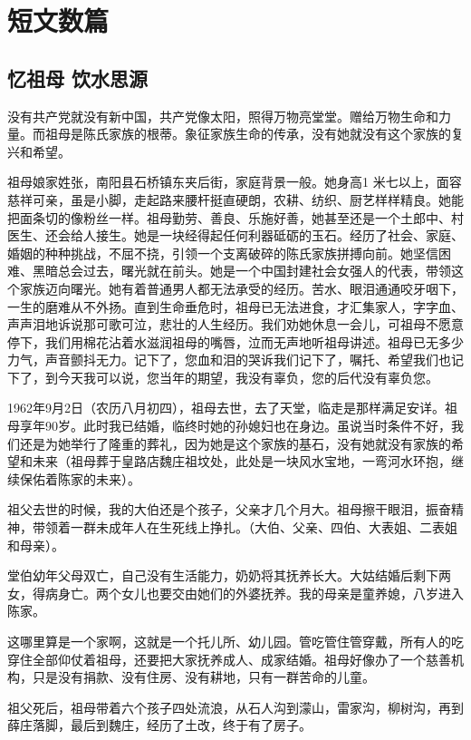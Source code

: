 \chapter{短文数篇}

\section*{忆祖母 饮水思源}

没有共产党就没有新中国，共产党像太阳，照得万物亮堂堂。赠给万物生命和力量。而祖母是陈氏家族的根蒂。象征家族生命的传承，没有她就没有这个家族的复兴和希望。

祖母娘家姓张，南阳县石桥镇东夹后街，家庭背景一般。她身高1 米七以上，面容慈祥可亲，虽是小脚，走起路来腰杆挺直硬朗，农耕、纺织、厨艺样样精良。她能把面条切的像粉丝一样。祖母勤劳、善良、乐施好善，她甚至还是一个土郎中、村医生、还会给人接生。她是一块经得起任何利器砥砺的玉石。经历了社会、家庭、婚姻的种种挑战，不屈不挠，引领一个支离破碎的陈氏家族拼搏向前。她坚信困难、黑暗总会过去，曙光就在前头。她是一个中国封建社会女强人的代表，带领这个家族迈向曙光。她有着普通男人都无法承受的经历。苦水、眼泪通通咬牙咽下，一生的磨难从不外扬。直到生命垂危时，祖母已无法进食，才汇集家人，字字血、声声泪地诉说那可歌可泣，悲壮的人生经历。我们劝她休息一会儿，可祖母不愿意停下，我们用棉花沾着水滋润祖母的嘴唇，泣而无声地听祖母讲述。祖母已无多少力气，声音颤抖无力。记下了，您血和泪的哭诉我们记下了，嘱托、希望我们也记下了，到今天我可以说，您当年的期望，我没有辜负，您的后代没有辜负您。

1962年9月2日（农历八月初四），祖母去世，去了天堂，临走是那样满足安详。祖母享年90岁。此时我已结婚，临终时她的孙媳妇也在身边。虽说当时条件不好，我们还是为她举行了隆重的葬礼，因为她是这个家族的基石，没有她就没有家族的希望和未来（祖母葬于皇路店魏庄祖坟处，此处是一块风水宝地，一弯河水环抱，继续保佑着陈家的未来）。

祖父去世的时候，我的大伯还是个孩子，父亲才几个月大。祖母擦干眼泪，振奋精神，带领着一群未成年人在生死线上挣扎。（大伯、父亲、四伯、大表姐、二表姐和母亲）。

堂伯幼年父母双亡，自己没有生活能力，奶奶将其抚养长大。大姑结婚后剩下两女，得病身亡。两个女儿也要交由她们的外婆抚养。我的母亲是童养媳，八岁进入陈家。

这哪里算是一个家啊，这就是一个托儿所、幼儿园。管吃管住管穿戴，所有人的吃穿住全部仰仗着祖母，还要把大家抚养成人、成家结婚。祖母好像办了一个慈善机构，只是没有捐款、没有住房、没有耕地，只有一群苦命的儿童。

祖父死后，祖母带着六个孩子四处流浪，从石人沟到濛山，雷家沟，柳树沟，再到薛庄落脚，最后到魏庄，经历了土改，终于有了房子。

